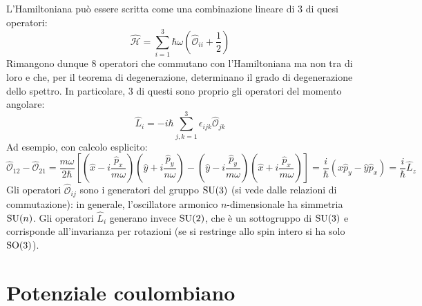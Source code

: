 L'Hamiltoniana può essere scritta come una combinazione lineare di 3 di quesi operatori:
\begin{equation}
	\hat{\mathcal{H}} = \sum_{i = 1}^{3} \hbar \omega \left( \hat{\mathcal{O}}_{ii} + \frac{1}{2} \right)
	\label{eq:3.41}
\end{equation}
Rimangono dunque 8 operatori che commutano con l'Hamiltoniana ma non tra di loro e che, per il teorema di degenerazione, determinano il grado di degenerazione dello spettro. In particolare, 3 di questi sono proprio gli operatori del momento angolare:
\begin{equation}
	\hat{L}_i = - i\hbar \sum_{j,k = 1}^{3} \epsilon_{ijk} \hat{\mathcal{O}}_{jk}
	\label{eq:3.42}
\end{equation}
Ad esempio, con calcolo esplicito:
\begin{equation*}
	\hat{\mathcal{O}}_{12} - \hat{\mathcal{O}}_{21} = \frac{m \omega}{2\hbar} \left[ \left( \hat{x} - i \frac{\hat{p}_x}{m\omega} \right) \left( \hat{y} + i \frac{\hat{p}_y}{n\omega} \right) - \left( \hat{y} - i \frac{\hat{p}_y}{m\omega} \right) \left( \hat{x} + i \frac{\hat{p}_x}{m\omega} \right) \right] = \frac{i}{\hbar} \left( \hat{x} \hat{p}_y - \hat{y} \hat{p}_x \right) = \frac{i}{\hbar} \hat{L}_z
\end{equation*}
Gli operatori $ \hat{\mathcal{O}}_{ij} $ sono i generatori del gruppo $ \mathrm{SU}(3) $ (si vede dalle relazioni di commutazione): in generale, l'oscillatore armonico $ n $-dimensionale ha simmetria $ \mathrm{SU}(n) $. Gli operatori $ \hat{L}_i $ generano invece $ \mathrm{SU}(2) $, che è un sottogruppo di $ \mathrm{SU}(3) $ e corrisponde all'invarianza per rotazioni (se si restringe allo spin intero si ha solo $ \mathrm{SO}(3) $).

\section{Potenziale coulombiano}

